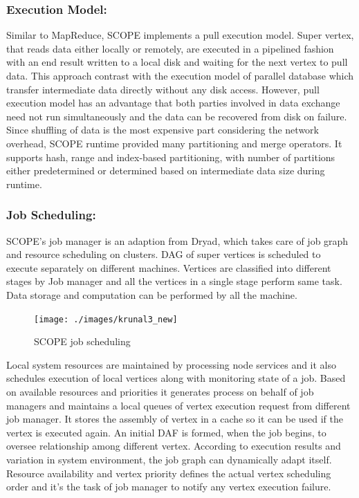 \documentclass[runningheads,a4paper]{llncs}
\begin{document}
{\subsubsection{Execution Model: }
Similar to MapReduce, SCOPE implements a pull execution model. Super vertex, that reads data either locally or remotely, are executed in a pipelined fashion with an end result written to a local disk and waiting for the next vertex to pull data. This approach contrast with the execution model of parallel database which transfer intermediate data directly without any disk access. However, pull execution model has an advantage that both parties involved in data exchange need not run simultaneously and the data can be recovered from disk on failure. Since shuffling of data is the most expensive part considering the network overhead, SCOPE runtime provided many partitioning and merge operators.  It supports hash, range and index-based partitioning, with number of partitions either predetermined or determined based on intermediate data size during runtime.\\

\subsubsection{Job Scheduling: }
SCOPE's job manager is an adaption from Dryad, which takes care of job graph and resource scheduling on clusters. DAG of super vertices is scheduled to execute separately on different machines. Vertices are classified into different stages by Job manager and all the vertices in a single stage perform same task.  Data storage and computation can be performed by all the machine.
\begin{figure}[!htb]
	\texttt{[image: ./images/krunal3\_new]}
	\centering
	\caption{SCOPE job scheduling }
	\label{fig:scope_job_sched}
\end{figure}
Local system resources are maintained by processing node services and it also schedules execution of local vertices along with monitoring state of a job. Based on available resources and priorities it generates process on behalf of job managers and maintains a local queues of vertex execution request from different job manager. It stores the assembly of vertex in a cache so it can be used if the vertex is executed again. An initial DAF is formed, when the job begins, to oversee relationship among different vertex. According to execution results and variation in system environment, the job graph can dynamically adapt itself. Resource availability and vertex priority defines the actual vertex scheduling order and it's the task of job manager to notify any vertex execution failure.\\

}
\end{document}
